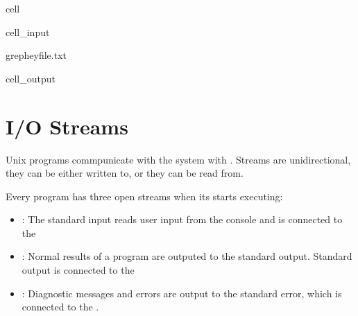 \documentclass[a4paper,10pt,english]{jupyterBook}
\begin{document}
\begin{sphinxuseclass}{cell}\begin{sphinxVerbatimInput}

\begin{sphinxuseclass}{cell_input}
\begin{sphinxVerbatim}[commandchars=\\\{\}]
grepheyfile.txt
\end{sphinxVerbatim}

\end{sphinxuseclass}\end{sphinxVerbatimInput}
\begin{sphinxVerbatimOutput}

\begin{sphinxuseclass}{cell_output}
\begin{sphinxVerbatim}[commandchars=\\\{\}]
\end{sphinxVerbatim}

\end{sphinxuseclass}\end{sphinxVerbatimOutput}

\end{sphinxuseclass}
\sphinxstepscope


\section{I/O Streams}
\label{\detokenize{text/progtut/unixstreams:i-o-streams}}\label{\detokenize{text/progtut/unixstreams::doc}}
\sphinxAtStartPar
Unix programs commpunicate with the system with . Streams are unidirectional, they can be either written to, or they can be read from.

\sphinxAtStartPar
Every program has three open streams when its starts executing:
\begin{itemize}
\item {} 
\sphinxAtStartPar
{}: The standard input reads user input from the console and is connected to the 

\item {} 
\sphinxAtStartPar
{}: Normal results of a program are outputed to the standard output. Standard output is connected to the 

\item {} 
\sphinxAtStartPar
{}: Diagnostic messages and errors are output to the standard error, which is connected to the .

\end{itemize}
\end{document}
